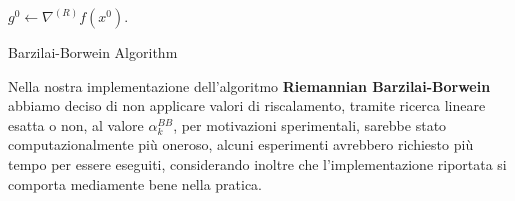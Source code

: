 \documentclass[a4paper, 12pt]{article}
\begin{document}
\begin{center}
\begin{algorithm}[H]
\SetAlgoLined
{}
$g^0 \leftarrow \nabla^{(R)} f(x^0)$.\\
\caption{Barzilai-Borwein Algorithm}
\end{algorithm}
\end{center}
Nella nostra implementazione dell'algoritmo \textbf{Riemannian Barzilai-Borwein} abbiamo deciso di non applicare valori di riscalamento, tramite ricerca lineare esatta o non, al valore $\alpha_k^{BB}$, per motivazioni sperimentali, sarebbe stato computazionalmente più oneroso, alcuni esperimenti avrebbero richiesto più tempo per essere eseguiti, considerando inoltre che l'implementazione riportata si comporta mediamente bene nella pratica.
\end{document}
